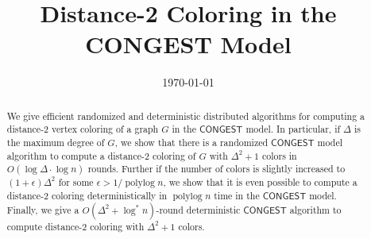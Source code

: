 \documentclass[manuscript,anonymous]{acmart}
\newcommand{\eps}{\ensuremath{\epsilon}}
\newcommand{\CONGEST}{\ensuremath{\mathsf{CONGEST}}\xspace}
\DeclareMathOperator{\polylog}{polylog}
\begin{document}
\title{Distance-2 Coloring in the CONGEST Model}
\author{}

  
\date{\today}

\begin{abstract}
    We give efficient randomized and deterministic distributed algorithms for computing a distance-$2$ vertex coloring of a graph $G$ in the \CONGEST model. In particular, if $\Delta$ is the maximum degree of $G$, we show that there is a randomized \CONGEST model algorithm to compute a distance-$2$ coloring of $G$ with $\Delta^2+1$ colors in $O(\log\Delta\cdot\log n)$ rounds. Further if the number of colors is slightly increased to $(1+\eps)\Delta^2$ for some $\eps>1/\polylog n$, we show that it is even possible to compute a distance-$2$ coloring deterministically in $\polylog n$ time in the \CONGEST model. Finally, we give a $O(\Delta^2 + \log^* n)$-round deterministic \CONGEST algorithm to compute distance-$2$ coloring with $\Delta^2+1$ colors.
\end{abstract}

\maketitle


%






\clearpage
\appendix
\tableofcontents



\end{document}
